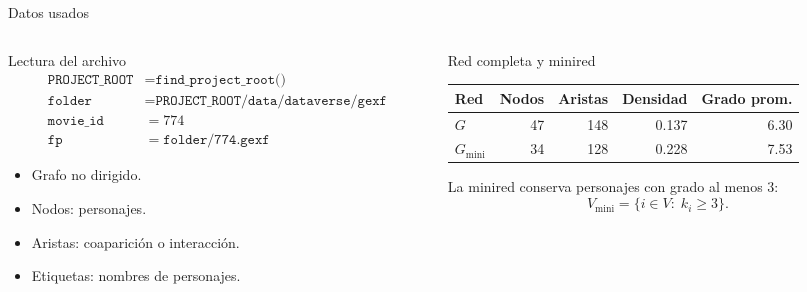 \documentclass[aspectratio=169,11pt]{beamer}
\newcommand{\Gmini}{G_{\mathrm{mini}}}
\begin{document}
\begin{frame}{Datos usados}
\begin{columns}[T,totalwidth=\textwidth]
\begin{column}{0.50\textwidth}
\begin{block}{Lectura del archivo}
\small
\begin{align*}
\texttt{PROJECT\_ROOT} &= \texttt{find\_project\_root()}\\
\texttt{folder} &= \texttt{PROJECT\_ROOT/data/dataverse/gexf}\\
\texttt{movie\_id} &= 774\\
\texttt{fp} &= \texttt{folder}/\texttt{774.gexf}
\end{align*}
\end{block}

\begin{itemize}
    \item Grafo no dirigido.
    \item Nodos: personajes.
    \item Aristas: coaparición o interacción.
    \item Etiquetas: nombres de personajes.
\end{itemize}
\end{column}

\begin{column}{0.47\textwidth}
\begin{block}{Red completa y minired}
\centering
\begin{tabular}{lrrrr}
\toprule
Red & Nodos & Aristas & Densidad & Grado prom.\\
\midrule
$G$ & 47 & 148 & 0.137 & 6.30\\
$\Gmini$ & 34 & 128 & 0.228 & 7.53\\
\bottomrule
\end{tabular}
\end{block}

\vspace{0.2cm}
\small
La minired conserva personajes con grado al menos $3$:
\[
V_{\mathrm{mini}}=\{i\in V:\; k_i\ge 3\}.
\]
\end{column}
\end{columns}
\end{frame}
\end{document}
